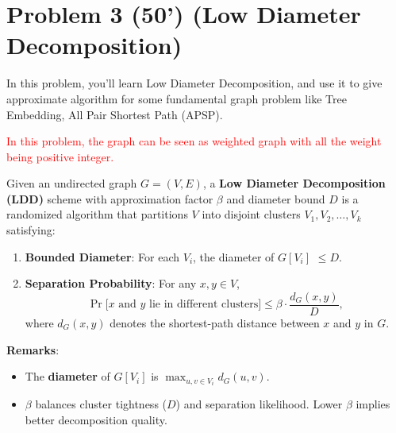 \section*{Problem 3 (50') (Low Diameter Decomposition)} 
In this problem, you'll learn Low Diameter Decomposition, and use it to give approximate algorithm for some fundamental graph problem like Tree Embedding, All Pair Shortest Path (APSP).

\textcolor{red}{In this problem, the graph can be seen as weighted graph with all the weight being positive integer. }
\begin{definition}
    Given an undirected graph $G = (V, E)$, a \textbf{Low Diameter Decomposition (LDD)} scheme with approximation factor $\beta$ and diameter bound $D$ is a randomized algorithm that partitions $V$ into disjoint clusters $V_1, V_2, \dots, V_k$ satisfying:
    \begin{enumerate}
        \item \textbf{Bounded Diameter}: For each $V_i$, the diameter of $G[V_i]$  $\leq D$.
        \item \textbf{Separation Probability}: For any $x, y \in V$,
        $$
            \Pr\big[\text{$x$ and $y$ lie in different clusters}\big] \leq \beta \cdot \frac{d_G(x, y)}{D},
        $$
        where $d_G(x, y)$ denotes the shortest-path distance between $x$ and $y$ in $G$.
    \end{enumerate}
\end{definition}

\noindent \textbf{Remarks}:
\begin{itemize}
    \item The \textbf{diameter} of $G[V_i]$ is $\max_{u,v \in V_i} d_{G}(u, v)$.
    \item $\beta$ balances cluster tightness ($D$) and separation likelihood. Lower $\beta$ implies better decomposition quality.
\end{itemize}

